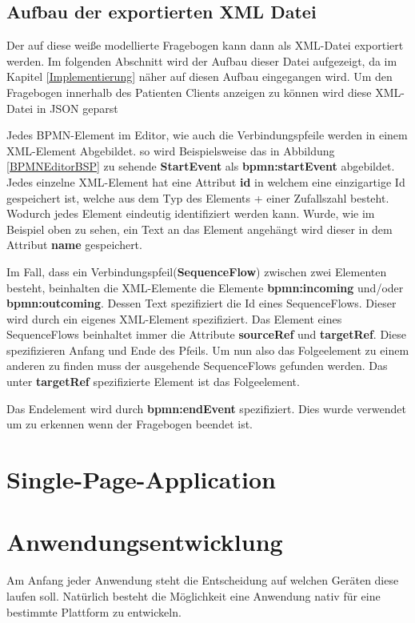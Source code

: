 \subsection{Aufbau der exportierten XML Datei}
Der auf diese weiße modellierte Fragebogen kann dann als XML-Datei exportiert werden. Im folgenden Abschnitt wird der Aufbau dieser Datei aufgezeigt, da im Kapitel \ref{Implementierung} näher auf diesen Aufbau eingegangen wird. Um den Fragebogen innerhalb des Patienten Clients anzeigen zu können wird diese XML-Datei in JSON geparst

Jedes BPMN-Element im Editor, wie auch die Verbindungspfeile werden in einem XML-Element Abgebildet. so wird Beispielsweise das in Abbildung \ref{BPMNEditorBSP} zu sehende \textbf{StartEvent} als \textbf{bpmn:startEvent} abgebildet. Jedes einzelne XML-Element hat eine Attribut \textbf{id} in welchem eine einzigartige Id gespeichert ist, welche aus dem Typ des Elements + einer Zufallszahl besteht. Wodurch jedes Element eindeutig identifiziert werden kann. Wurde, wie im Beispiel oben zu sehen, ein Text an das Element angehängt wird dieser in dem Attribut \textbf{name} gespeichert.

Im Fall, dass ein Verbindungspfeil(\textbf{SequenceFlow}) zwischen zwei Elementen besteht, beinhalten die XML-Elemente die Elemente \textbf{bpmn:incoming} und/oder \textbf{bpmn:outcoming}. Dessen Text spezifiziert die Id eines SequenceFlows. Dieser wird durch ein eigenes XML-Element spezifiziert. Das Element eines SequenceFlows beinhaltet immer die Attribute \textbf{sourceRef} und \textbf{targetRef}. Diese spezifizieren Anfang und Ende des Pfeils. Um nun also das Folgeelement zu einem anderen zu finden muss der ausgehende SequenceFlows gefunden werden. Das unter \textbf{targetRef} spezifizierte Element ist das Folgeelement.

Das Endelement wird durch \textbf{bpmn:endEvent} spezifiziert. Dies wurde verwendet um zu erkennen wenn der Fragebogen beendet ist.
\section{Single-Page-Application}\label{Single-Page-Application}
\section{Anwendungsentwicklung}\label{Anwendungsentwicklung}
Am Anfang jeder Anwendung steht die Entscheidung auf welchen Geräten diese laufen soll. Natürlich besteht die Möglichkeit eine Anwendung nativ für eine bestimmte Plattform zu entwickeln.

